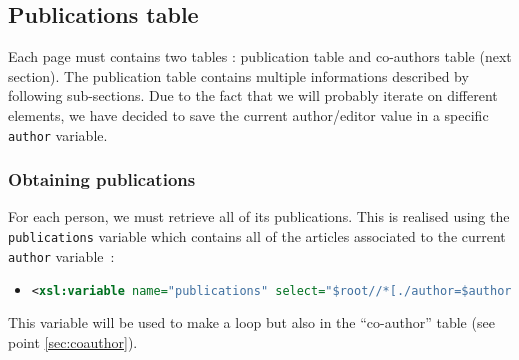 \documentclass{article}
\begin{document}
  \subsection{Publications table}
  Each page must contains two tables : publication table and co-authors table (next section). The publication table contains multiple informations described by following sub-sections. Due to the fact that we will probably iterate on different elements, we have decided to save the current author/editor value in a specific \verb|author| variable.
    \subsubsection{Obtaining publications}
      For each person, we must retrieve all of its publications. This is realised using the \verb|publications| variable which contains all of the articles associated to the current \verb|author| variable~:
 \begin{itemize}
	\item \begin{lstlisting}[language=XML]
<xsl:variable name="publications" select="$root//*[./author=$author or ./editor=$author]" />\end{lstlisting}
      \end{itemize}
      This variable will be used to make a loop but also in the ``co-author'' table (see point \ref{sec:coauthor}).
      
\end{document}
